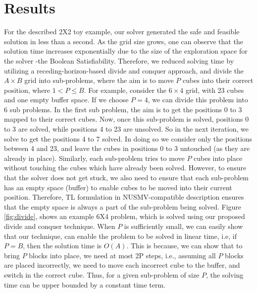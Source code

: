 \documentclass[3p,twocolumn,times,procedia]{elsarticle}
\begin{document}
\section{Results}
For the described 2X2 toy example, our solver generated the safe and feasible solution in less than a second. As the grid size grows, one can observe that the solution time increases exponentially due to the size of the exploration space for the solver -the Boolean Satisfiability. Therefore, we reduced solving time by utilizing a receding-horizon-based divide and conquer approach, and divide the $A\times B$ grid into sub-problems, where the aim is to move $P$ cubes into their correct position, where $1<P\leq B$. %
For example, consider the $6\times 4$ grid, with 23 cubes and one empty buffer space. If we choose $P=4$, we can divide this problem into 6 sub problems. In the first sub problem, the aim is to get the positions 0 to 3 mapped to their correct cubes. Now, once this sub-problem is solved, positions 0 to 3 are solved, while positions 4 to 23 are unsolved. So in the next iteration, we solve to get the positions 4 to 7 solved. In doing so we consider only the positions between 4 and 23, and leave the cubes in positions 0 to 3 untouched (as they are already in place). Similarly, each sub-problem tries to move $P$ cubes into place without touching the cubes which have already been solved. However, to ensure that the solver does not get stuck, we also need to ensure that each sub-problem has an empty space (buffer) to enable cubes to be moved into their current position. Therefore, TL formulation in NUSMV-compatible description ensures that the empty space is always a part of the sub-problem being solved. Figure \ref{fig:divide}, shows an example 6X4 problem, which is solved using our proposed divide and conquer technique. 
When $P$ is sufficiently small, we can easily show that our technique, can enable the problem to be solved in linear time, i.e, if $P=B$, then the solution time is $O(A)$. This is because, we can show that to bring $P$ blocks into place, we need at most 2P steps, i.e., assuming all $P$ blocks are placed incorrectly, we need to move each incorrect cube to the buffer, and switch in the correct cube. Thus, for a given sub-problem of size $P$, the solving time can be upper bounded by a constant time term.
\end{document}
